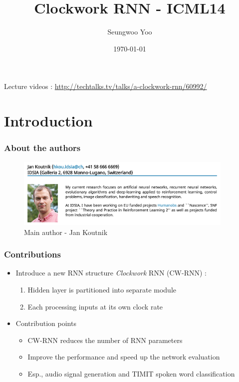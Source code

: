 \documentclass{beamer}
\title{Clockwork RNN - ICML14}
\author{Seungwoo Yoo}
\date{\today}
\begin{document}
\begin{frame}
  \vspace*{1.5cm}\titlepage  
  \centering Lecture videos : \url{http://techtalks.tv/talks/a-clockwork-rnn/60992/}
\end{frame}

\section[Outline]{}
\frame{\tableofcontents}

\section{Introduction}
\frame
{
	\frametitle{About the authors}
    \begin{figure}[ht]  
		\begin{center}
			\includegraphics[width=4.1in]{Images/author.png}   
		\end{center}   
		\caption{Main author - Jan Koutnik}
	\end{figure}
}
\frame
{
	\frametitle{Contributions}
	\begin{itemize}
        \item Introduce a new RNN structure \textit{Clockwork} RNN (CW-RNN) :
			\begin{enumerate}
			\item Hidden layer is partitioned into separate module
			\item Each processing inputs at its own clock rate
			\end{enumerate}
		\item Contribution points
			\begin{itemize}
			\item CW-RNN reduces the number of RNN parameters
			\item Improve the performance and speed up the network evaluation
            \item Esp., audio signal generation and TIMIT spoken word classification
			\end{itemize}
	\end{itemize}
}
\end{document}
